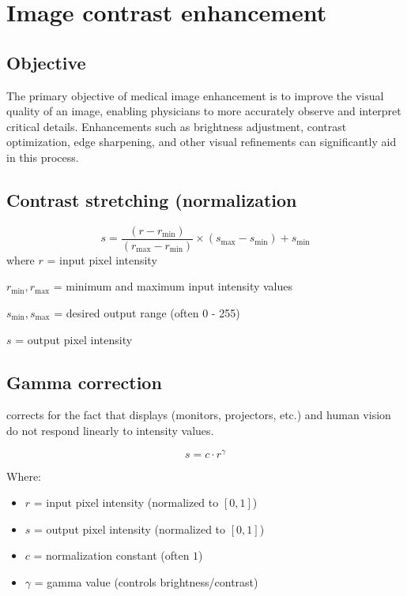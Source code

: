 \chapter{Image contrast enhancement}

\section{Objective}
The primary objective of medical image enhancement is to improve the
visual quality of an image, enabling physicians to more accurately
observe and interpret critical details. Enhancements such as
brightness adjustment, contrast optimization, edge sharpening, and
other visual refinements can significantly aid in this process.

\section{Contrast stretching (normalization}
\begin{equation}
s = \frac{(r - r_{\min})}{(r_{\max} - r_{\min})} \times (s_{\max} - s_{\min}) + s_{\min}
\end{equation}
where $r$ = input pixel intensity

$r_{\text{min}},r_{\text{max}}$  = minimum and maximum input intensity values

$s_{\text{min}},s_{\text{max}}$
 = desired output range (often 0 - 255)

$s$ = output pixel intensity

\section{Gamma correction}

corrects for the fact that displays (monitors, projectors, etc.) and human vision do not respond linearly to intensity values.

\begin{equation}
s = c \cdot r^{\gamma}
\end{equation}

Where:
\begin{itemize}
    \item $r$ = input pixel intensity (normalized to $[0,1]$)
    \item $s$ = output pixel intensity (normalized to $[0,1]$)
    \item $c$ = normalization constant (often $1$)
    \item $\gamma$ = gamma value (controls brightness/contrast)
\end{itemize}


